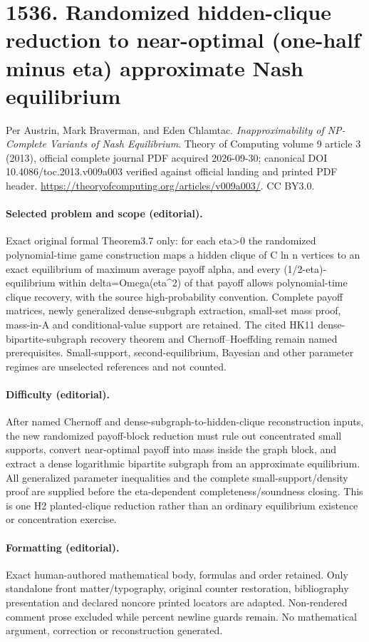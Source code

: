 \documentclass[10pt]{article}
\theoremstyle{definition}
\numberwithin{equation}{section}
\begin{document}
\section*{1536. Randomized hidden-clique reduction to near-optimal (one-half minus eta) approximate Nash equilibrium}
Per Austrin, Mark Braverman, and Eden Chlamtac. \emph{Inapproximability of NP-Complete Variants of Nash Equilibrium}. Theory of Computing volume 9 article 3 (2013), official complete journal PDF acquired 2026-09-30; canonical DOI 10.4086/toc.2013.v009a003 verified against official landing and printed PDF header. \url{https://theoryofcomputing.org/articles/v009a003/}. CC BY3.0.
\paragraph{Selected problem and scope (editorial).} Exact original formal Theorem3.7 only: for each eta>0 the randomized polynomial-time game construction maps a hidden clique of C ln n vertices to an exact equilibrium of maximum average payoff alpha, and every (1/2-eta)-equilibrium within delta=Omega(eta\textasciicircum{}2) of that payoff allows polynomial-time clique recovery, with the source high-probability convention. Complete payoff matrices, newly generalized dense-subgraph extraction, small-set mass proof, mass-in-A and conditional-value support are retained. The cited HK11 dense-bipartite-subgraph recovery theorem and Chernoff–Hoeffding remain named prerequisites. Small-support, second-equilibrium, Bayesian and other parameter regimes are unselected references and not counted.
\paragraph{Difficulty (editorial).} After named Chernoff and dense-subgraph-to-hidden-clique reconstruction inputs, the new randomized payoff-block reduction must rule out concentrated small supports, convert near-optimal payoff into mass inside the graph block, and extract a dense logarithmic bipartite subgraph from an approximate equilibrium. All generalized parameter inequalities and the complete small-support/density proof are supplied before the eta-dependent completeness/soundness closing. This is one H2 planted-clique reduction rather than an ordinary equilibrium existence or concentration exercise.
\paragraph{Formatting (editorial).} Exact human-authored mathematical body, formulas and order retained. Only standalone front matter/typography, original counter restoration, bibliography presentation and declared noncore printed locators are adapted. Non-rendered comment prose excluded while percent newline guards remain. No mathematical argument, correction or reconstruction generated.
\end{document}
